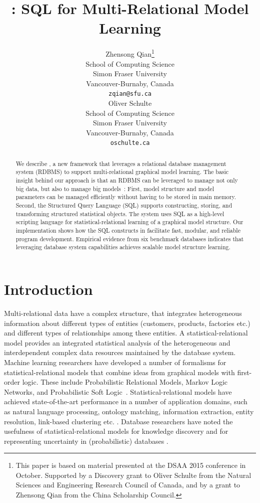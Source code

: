 \documentclass{article} %
\title{\FB: SQL for Multi-Relational Model Learning}
\author{
Zhensong Qian\thanks{This paper is based on material presented at the DSAA 2015 conference in October. Supported by a Discovery grant to Oliver Schulte from the Natural Sciences and Engineering Research Council of Canada, and by a grant to Zhensong Qian from the China Scholarship Council.} 
\\ School of Computing Science\\ Simon Fraser University\\Vancouver-Burnaby, Canada\\
\texttt{zqian@sfu.ca} \\
\And
Oliver Schulte 
\\ School of Computing Science\\ Simon Fraser University\\Vancouver-Burnaby, Canada\\
\texttt{oschulte.ca} \\
}
\begin{document}
\maketitle

\begin{abstract} We describe \FB, a new framework that leverages a relational database management system (RDBMS) to support multi-relational graphical model learning. The basic insight behind our approach is that an RDBMS can be leveraged to manage not only big data, but also to manage big models~\cite{Wang2008,Niu2011}: First, model structure and model parameters can be managed efficiently without having to be stored in main memory. Second, the Structured Query Language (SQL) supports constructing, storing, and transforming structured statistical objects. The \FB system uses SQL as a high-level scripting language for statistical-relational learning of a graphical model structure. 
Our implementation shows how the SQL constructs in \FB facilitate fast, modular, and reliable program development. Empirical evidence from six benchmark databases indicates that leveraging database system capabilities  achieves scalable model structure learning.
\end{abstract}

\section{Introduction} 

Multi-relational data have a complex structure, that integrates heterogeneous information about different types of entities (customers, products, factories etc.) and different types of relationships among these entities. A statistical-relational model provides an integrated statistical analysis of the heterogeneous and interdependent complex data resources maintained by the database system. Machine learning researchers have developed a number of formalisms for statistical-relational models that combine ideas from graphical models with first-order logic. These include Probabilistic Relational Models, Markov Logic Networks, and Probabilistic Soft Logic~\cite{Kimmig2015}. 
Statistical-relational models have achieved state-of-the-art performance in a number of application domains, such as natural language processing, ontology matching, information extraction, entity resolution, link-based clustering etc. 
\cite{Domingos2009,Niu2011}. Database researchers have noted the usefulness of statistical-relational models for knowledge discovery and for representing uncertainty in (probabilistic) databases 
\cite{Singh2013,Wang2008,Graepel_CIKM13}. 
\end{document}
